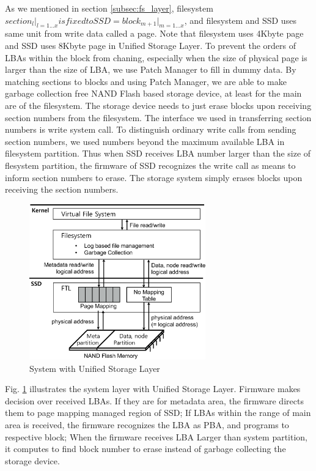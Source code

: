 \documentclass[letterpaper,twocolumn,10pt]{article}
\begin{document}
As we mentioned in section \ref{subsec:fs_layer}, filesystem $section_l\big|_{l=1...x} is fixed to SSD =block_{m+1}\big|_{m=1...x}$, and filesystem and SSD uses same unit from write data called a page. Note that filesystem uses 4Kbyte page and SSD uses 8Kbyte page in Unified Storage Layer. To prevent the orders of LBAs within the block from chaning, especially when the size of physical page is larger than the size of LBA, we use Patch Manager to fill in dummy data. By matching sections to blocks and using Patch Manager, we are able to make garbage collection free NAND Flash based storage device, at least for the main are of the filesystem. The storage device needs to just erase blocks upon receiving section numbers from the filesystem. The interface we used in transferring section numbers is write system call. To distinguish ordinary write calls from sending section numbers, we used numbers beyond the maximum available LBA in filesystem partition. Thus when SSD receives LBA number larger than the size of flesystem partition, the firmware of SSD recognizes the write call as means to inform section numbers to erase. The storage system simply erases blocks upon receiving the section numbers. 


\begin{figure}[h]
\begin{center}
\includegraphics[width=3in]{./figure/usl_architecture}
\caption{System with Unified Storage Layer}
\label{fig:usl_layout}
\end{center}
\end{figure}

Fig. \ref{fig:usl_layout} illustrates the system layer with Unified Storage Layer. Firmware makes decision over received LBAs. If they are for metadata area, the firmware directs them to page mapping managed region of SSD; If LBAs within the range of main area is received, the firmware recognizes the LBA as PBA, and programs to respective block; When the firmware receives LBA Larger than system partition, it computes to find block number to erase instead of garbage collecting the storage device.
\end{document}
